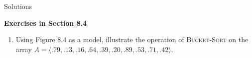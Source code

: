 \documentclass[12pt,reqno]{amsart}
\newif\ifanswer
\begin{document}
\hspace{10.5cm} {\footnotesize Solutions}

\vspace{0.5cm}
\hspace{5.5cm}\textbf{\large Exercises in Section 8.4}
\vspace{0.5cm}

\begin{enumerate}[1.]

\item Using Figure 8.4 as a model, illustrate the operation of \textsc{Bucket-Sort} on the array $A = \langle .79, .13, .16, .64, .39, .20, .89, .53, .71, .42 \rangle$.
\vspace{0.5cm}

\ifanswer
{}


\end{enumerate}
\end{document}
